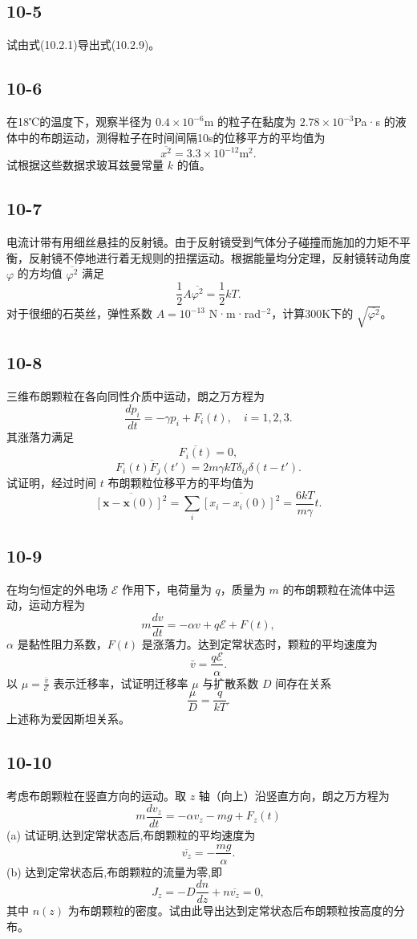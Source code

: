\newpage
\subsection{10-5}
试由式(10.2.1)导出式(10.2.9)。

\newpage
\subsection{10-6}
在18℃的温度下，观察半径为 $0.4 \times 10^{-6}$m 的粒子在黏度为 $2.78 \times 10^{-3}$Pa·s 的液体中的布朗运动，测得粒子在时间间隔10s的位移平方的平均值为
$$ \overline{x^2} = 3.3 \times 10^{-12}  \text{m}^2. $$
试根据这些数据求玻耳兹曼常量 $k$ 的值。

\newpage
\subsection{10-7}
电流计带有用细丝悬挂的反射镜。由于反射镜受到气体分子碰撞而施加的力矩不平衡，反射镜不停地进行着无规则的扭摆运动。根据能量均分定理，反射镜转动角度 $\varphi$ 的方均值 $\overline{\varphi^2}$ 满足
$$ \frac{1}{2} A \overline{\varphi^2} = \frac{1}{2} kT. $$
对于很细的石英丝，弹性系数 $A = 10^{-13}$ N·m·rad$^{-2}$，计算300K下的 $\sqrt{\overline{\varphi^2}}$。

\newpage
\subsection{10-8}
三维布朗颗粒在各向同性介质中运动，朗之万方程为
$$ \frac{dp_i}{dt} = -\gamma p_i + F_i(t), \quad i = 1, 2, 3. $$
其涨落力满足
$$ \overline{F_i(t)} = 0, $$
$$ \overline{F_i(t) F_j(t')} = 2m\gamma k T \delta_{ij} \delta (t-t'). $$
试证明，经过时间 $t$ 布朗颗粒位移平方的平均值为
$$ \overline{\left[ \mathbf{x} - \mathbf{x}(0) \right]^2} = \sum_{i} \overline{\left[ x_i - x_i(0) \right]^2} = \frac{6kT}{m\gamma} t. $$

\newpage
\subsection{10-9}
在均匀恒定的外电场 $\mathscr{E}$ 作用下，电荷量为 $q$，质量为 $m$ 的布朗颗粒在流体中运动，运动方程为
$$ m \frac{dv}{dt} = -\alpha v + q \mathscr{E} + F(t), $$
$\alpha$ 是黏性阻力系数，$F(t)$ 是涨落力。达到定常状态时，颗粒的平均速度为
$$ \bar{v} = \frac{q\mathscr{E}}{\alpha}. $$
以 $\mu = \frac{\bar{v}}{\mathscr{E}}$ 表示迁移率，试证明迁移率 $\mu$ 与扩散系数 $D$ 间存在关系
$$ \frac{\mu}{D} = \frac{q}{kT}. $$
上述称为爱因斯坦关系。

\newpage
\subsection{10-10}
考虑布朗颗粒在竖直方向的运动。取 $z$ 轴（向上）沿竖直方向，朗之万方程为
$$ m \frac{dv_z}{dt} = -\alpha v_z - mg + F_z(t) $$
(a) 试证明,达到定常状态后,布朗颗粒的平均速度为
$$ \overline{v_z} = -\frac{mg}{\alpha}. $$
(b) 达到定常状态后,布朗颗粒的流量为零,即
$$ J_z = -D \frac{dn}{dz} + n \overline{v_z} = 0, $$
其中 $n(z)$ 为布朗颗粒的密度。试由此导出达到定常状态后布朗颗粒按高度的分布。

